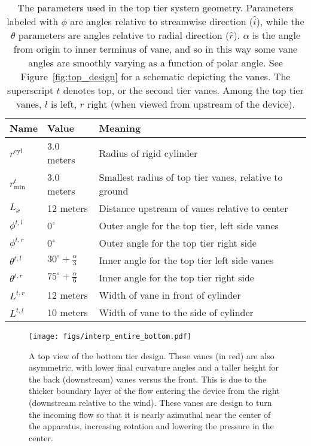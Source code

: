 \begin{table}[]
\centering
 \caption{The parameters used in the top tier system
 geometry. Parameters labeled with $\phi$ are angles relative to
 streamwise direction ($\hat i$), while the $\theta$ parameters are
 angles relative to radial direction ($\hat r$). $\alpha$ is the angle
 from origin to inner terminus of vane, and so in this way some vane
 angles are smoothly varying as a function of polar angle. See
 Figure~\ref{fig:top_design} for a schematic depicting the vanes. The
 superscript $t$ denotes top, or the second tier vanes. Among the top
 tier vanes, $l$ is left, $r$ right (when viewed from upstream of the
 device).}
\begin{tabular}{l|l|l}
Name                        & Value & Meaning                    \\
 \hline
$r^{\text{cyl}}$            &  3.0 meters & Radius of rigid cylinder \\
$r^t_{\text{min}}$          &  3.0 meters & Smallest radius of top tier
	 vanes, relative to ground \\
$L_x$                       &  12 meters  & Distance upstream
	 of vanes relative to center\\
$\phi^{t,l}$ &  $0^{\circ}$   & Outer angle for the top tier, left side vanes \\
$\phi^{t,r}$   &  $0^{\circ}$   & Outer angle for the top tier right side \\
$\theta^{t,l}$ &   $30^{\circ} +\frac{\alpha}{3}$  & Inner angle for the top tier left side vanes\\
$\theta^{t,r}$   &   $75^{\circ} +\frac{\alpha}{6}$   & Inner angle for the top tier right side \\
$L^{t,r}$                   &  12 meters  & Width of vane in front of cylinder \\
$L^{t,l}$                   &  10 meters  & Width of vane to the side of cylinder \\
\end{tabular}
 \label{tab:top}
\end{table}



 \begin{figure}[!htb]
  \begin{center}
   \texttt{[image: figs/interp\_entire\_bottom.pdf]}
   \caption{A top view of the bottom tier design. These vanes (in red)
   are also asymmetric, with lower final curvature angles and a taller
   height for the back (downstream) vanes versus the front. This is due
   to the thicker boundary layer of the flow entering the device from
   the right (downstream relative to the wind). These vanes are design
   to turn the incoming flow so that it is nearly azimuthal near the
   center of the apparatus, increasing rotation and lowering the
   pressure in the center.}
   \label{fig:bottom_design}
  \end{center}
 \end{figure}

